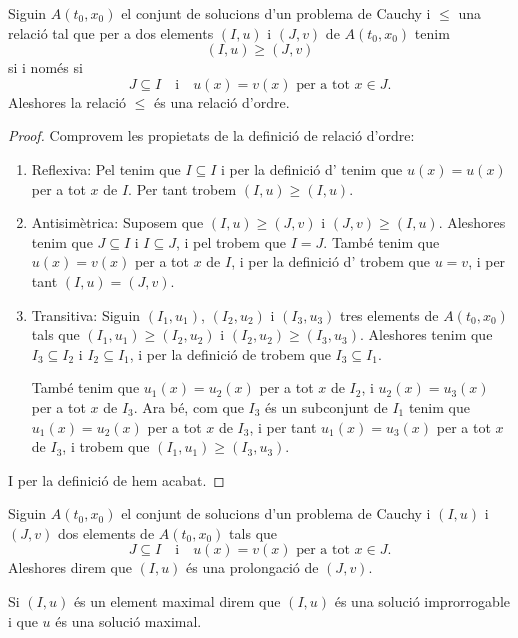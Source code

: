 \documentclass[../Apunts.tex]{subfiles}
\begin{document}
	\begin{proposition}
		\label{prop:la prolongació és una relació d'ordre}
		Siguin \(A(t_{0},x_{0})\) el conjunt de solucions d'un problema de Cauchy i \(\leq\) una relació tal que per a dos elements \((I,u)\) i \((J,v)\) de \(A(t_{0},x_{0})\) tenim
		\[(I,u)\geq(J,v)\]
		si i només si
		\[J\subseteq I\quad\text{i}\quad u(x)=v(x)\text{ per a tot }x\in J.\]
		Aleshores la relació \(\leq\) és una relació d'ordre.
		\begin{proof}
			Comprovem les propietats de la definició de relació d'ordre:
			\begin{enumerate}
				\item Reflexiva: Pel  tenim que \(I\subseteq I\) i per la definició d' tenim que \(u(x)=u(x)\) per a tot \(x\) de \(I\). Per tant trobem \((I,u)\geq(I,u)\).
				
				\item Antisimètrica: Suposem que \((I,u)\geq(J,v)\) i \((J,v)\geq(I,u)\). Aleshores tenim que \(J\subseteq I\) i \(I\subseteq J\), i pel  trobem que \(I=J\). També tenim que \(u(x)=v(x)\) per a tot \(x\) de \(I\), i per la definició d' trobem que \(u=v\), i per tant \((I,u)=(J,v)\).
				
				\item Transitiva: Siguin \((I_{1},u_{1})\), \((I_{2},u_{2})\) i \((I_{3},u_{3})\) tres elements de \(A(t_{0},x_{0})\) tals que \((I_{1},u_{1})\geq(I_{2},u_{2})\) i \((I_{2},u_{2})\geq(I_{3},u_{3})\). Aleshores tenim que \(I_{3}\subseteq I_{2}\) i \(I_{2}\subseteq I_{1}\), i per la definició de  trobem que \(I_{3}\subseteq I_{1}\).
				
				També tenim que \(u_{1}(x)=u_{2}(x)\) per a tot \(x\) de \(I_{2}\), i \(u_{2}(x)=u_{3}(x)\) per a tot \(x\) de \(I_{3}\). Ara bé, com que \(I_{3}\) és un subconjunt de \(I_{1}\) tenim que \(u_{1}(x)=u_{2}(x)\) per a tot \(x\) de \(I_{3}\), i per tant \(u_{1}(x)=u_{3}(x)\) per a tot \(x\) de \(I_{3}\), i trobem que \((I_{1},u_{1})\geq(I_{3},u_{3})\).
			\end{enumerate}
			I per la definició de  hem acabat.
		\end{proof}
	\end{proposition}
	\begin{definition}[Prolongació]
		\label{def:prolongació}
		\label{def:solució improrrogable}
		\label{def:solució maximal}
		Siguin \(A(t_{0},x_{0})\) el conjunt de solucions d'un problema de Cauchy i \((I,u)\) i \((J,v)\) dos elements de \(A(t_{0},x_{0})\) tals que
		\[J\subseteq I\quad\text{i}\quad u(x)=v(x)\text{ per a tot }x\in J.\]
		Aleshores direm que \((I,u)\) és una prolongació de \((J,v)\).
		
		Si \((I,u)\) és un element maximal direm que \((I,u)\) és una solució improrrogable i que \(u\) és una solució maximal.
	\end{definition}
\end{document}
